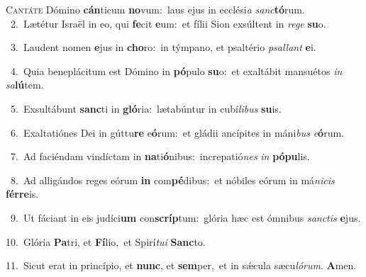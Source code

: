 \lettrine{\initial\textcolor{\initialcolor}{C}}{antáte} Dómino \textbf{cán}\-ticum \textbf{no}\-vum:~\star laus ejus in ecclési\textit{a} \textit{sanc}\-\textbf{tó}rum.\\
{\numbfont\textcolor{\numbcolor}{~2.}}~Lætétur Israël in eo, qui \textbf{fe}\-cit \textbf{e}\-um:~\star et fílii Sion exsúltent in \textit{re}\-\textit{ge} \textbf{su}\-o.\par
{\numbfont\textcolor{\numbcolor}{~3.}}~Laudent nomen \textbf{e}\-jus in \textbf{cho}\-ro:~\star in týmpano, et psaltério \textit{psal}\-\textit{lant} \textbf{e}\-i.\par
{\numbfont\textcolor{\numbcolor}{~4.}}~Quia beneplácitum est Dómino in \textbf{pó}\-pulo \textbf{su}\-o:~\star et exaltábit mansuétos \textit{in} \textit{sa}\-\textbf{lú}tem.\par
{\numbfont\textcolor{\numbcolor}{~5.}}~Exsultábunt \textbf{sanc}\-ti in \textbf{gló}\-ria:~\star lætabúntur in cubí\-\textit{li}\-\textit{bus} \textbf{su}\-is.\par
{\numbfont\textcolor{\numbcolor}{~6.}}~Exaltatiónes Dei in gúttu\textbf{re} e\-\textbf{ó}\-rum:~\star et gládii ancípites in máni\textit{bus} \textit{e}\-\textbf{ó}rum.\par
{\numbfont\textcolor{\numbcolor}{~7.}}~Ad faciéndam vindíctam in \textbf{na}\-ti\-\textbf{ó}\-nibus:~\star increpatió\textit{nes} \textit{in} \textbf{pó}\-\textbf{pu}lis.\par
{\numbfont\textcolor{\numbcolor}{~8.}}~Ad alligándos reges eórum \textbf{in} com\-\textbf{pé}\-dibus:~\star et nóbiles eórum in má\-\textit{ni}\-\textit{cis} \textbf{fér}\-\textbf{re}is.\par
{\numbfont\textcolor{\numbcolor}{~9.}}~Ut fáciant in eis judíci\textbf{um} con\-\textbf{scríp}\-tum:~\star glória hæc est ómnibus \textit{sanc}\-\textit{tis} \textbf{e}\-jus.\par
{\numbfont\textcolor{\numbcolor}{10.}}~Glória \textbf{Pa}\-tri, et \textbf{Fí}\-lio,~\star et Spirí\-\textit{tu}\-\textit{i} \textbf{Sanc}\-to.\par
{\numbfont\textcolor{\numbcolor}{11.}}~Sicut erat in princípio, et \textbf{nunc}\-, et \textbf{sem}\-per,~\star et in sǽcula sæcu\-\textit{ló}\-\textit{rum}. \textbf{A}\-men.\par
